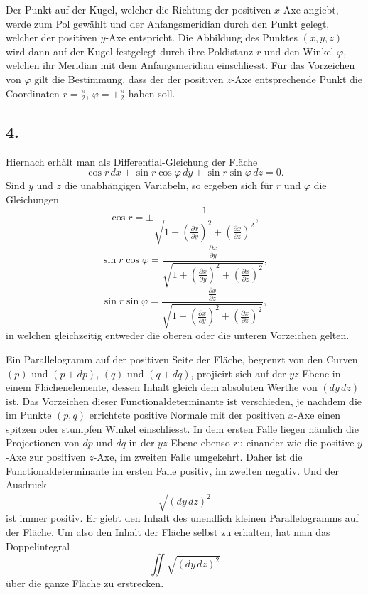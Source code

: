 \documentclass[12pt,a4paper]{article}
\begin{document}
Der Punkt auf der Kugel, welcher die Richtung der positiven $x$-Axe angiebt, werde zum Pol gew\"ahlt und der Anfangsmeridian durch den Punkt gelegt, welcher der positiven $y$-Axe entspricht. Die Abbildung des Punktes $(x,y,z)$ wird dann auf der Kugel festgelegt durch ihre Poldistanz $r$ und den Winkel $\varphi$, welchen ihr Meridian mit dem Anfangsmeridian einschliesst. F\"ur das Vorzeichen von $\varphi$ gilt die Bestimmung, dass der der positiven $z$-Axe entsprechende Punkt die Coordinaten $r=\frac{\pi}{2}$, $\varphi = +\frac{\pi}{2}$ haben soll.

\subsection*{4.}

Hiernach erh\"alt man als Differential-Gleichung der Fl\"ache
\begin{equation}\tag{1}
\cos r\, dx + \sin r \cos\varphi\, dy + \sin r \sin\varphi\, dz = 0.
\end{equation}
Sind $y$ und $z$ die unabh\"angigen Variabeln, so ergeben sich f\"ur $r$ und $\varphi$ die Gleichungen
\[\cos r = \pm \frac{1}{\sqrt{1 + \left(\frac{\partial x}{\partial y}\right)^{2} + \left(\frac{\partial x}{\partial z}\right)^{2}}},\]
\[\sin r \cos\varphi = \frac{\frac{\partial x}{\partial y}}{\sqrt{1 + \left(\frac{\partial x}{\partial y}\right)^{2} + \left(\frac{\partial x}{\partial z}\right)^{2}}},\]
\[\sin r \sin\varphi = \frac{\frac{\partial x}{\partial z}}{\sqrt{1 + \left(\frac{\partial x}{\partial y}\right)^{2} + \left(\frac{\partial x}{\partial z}\right)^{2}}},\]
in welchen gleichzeitig entweder die oberen oder die unteren Vorzeichen gelten.

\newpage
Ein Parallelogramm auf der positiven Seite der Fl\"ache, begrenzt von den Curven $(p)$ und $(p+dp)$, $(q)$ und $(q+dq)$, projicirt sich auf der $yz$-Ebene in einem Fl\"achenelemente, dessen Inhalt gleich dem absoluten Werthe von $(dy\, dz)$ ist. Das Vorzeichen dieser Functionaldeterminante ist verschieden, je nachdem die im Punkte $(p,q)$ errichtete positive Normale mit der positiven $x$-Axe einen spitzen oder stumpfen Winkel einschliesst. In dem ersten Falle liegen n\"amlich die Projectionen von $dp$ und $dq$ in der $yz$-Ebene ebenso zu einander wie die positive $y$-Axe zur positiven $z$-Axe, im zweiten Falle umgekehrt. Daher ist die Functionaldeterminante im ersten Falle positiv, im zweiten negativ. Und der Ausdruck
\[\sqrt{(dy\, dz)^{2}}\]
ist immer positiv. Er giebt den Inhalt des unendlich kleinen Parallelogramms auf der Fl\"ache. Um also den Inhalt der Fl\"ache selbst zu erhalten, hat man das Doppelintegral
\[\iint \sqrt{(dy\, dz)^{2}}\]
\"uber die ganze Fl\"ache zu erstrecken.
\end{document}
